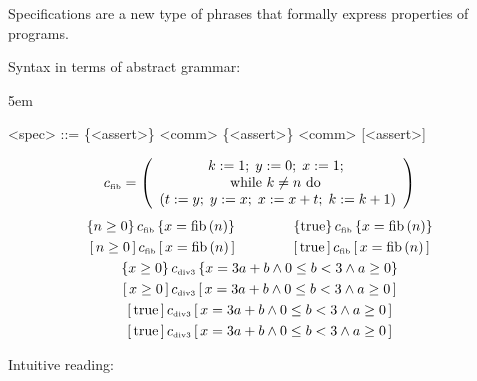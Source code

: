 \begin{enumcirc}
	\item
	Specifications are a new type of phrases that formally express properties of
	programs.
	\item
	Syntax in terms of abstract grammar:
	\begin{center}
		\begin{minipage}{0.5\textwidth}
			\grammarindent5em
			\begin{grammar}
				<spec> ::= \{<assert>\} <comm> \{<assert>\}
				\alt [<assert>] <comm> [<assert>]
			\end{grammar}
		\end{minipage}
	\end{center}
	\begin{exampletab}
		\[
			c_{\textrm{\tiny fib}} = \left( 
				\begin{array}{c}
					k := 1;\; y := 0;\; x:=1;\; \\
					\textrm{while } k \ne n \textrm{ do }            \\ \left( t := y;\; y := x;\; x := x + t;\; k := k + 1 \right)
				\end{array}
			 \right)
		\]
		\[
			\begin{array}{c}
				\left\{ n \ge 0 \right\}
				c_{\textrm{\tiny fib}}
				\left\{ x = \textrm{fib}\left( n \right) \right\}
				\qquad \qquad
				\left\{ \textrm{true} \right\}
				c_{\textrm{\tiny fib}}
				\left\{ x = \textrm{fib}\left( n \right) \right\}
				\\[0.3em]
				\left[ \, n \ge 0 \, \right]
				c_{\textrm{\tiny fib}}
				\left[ \, x = \textrm{fib}\left( n \right) \, \right]
				\qquad \qquad
				\left[ \, \textrm{true} \, \right]
				c_{\textrm{\tiny fib}}
				\left[ \, x = \textrm{fib}\left( n \right) \, \right]
				\\[0.3em]
				\left\{ x \ge 0 \right\}
				c_{\textrm{\tiny div3}}
				\left\{ x = 3a + b \wedge 0 \le b < 3 \wedge a \ge 0 \right\}
				\\[0.3em]
				\left[ \, x \ge 0 \, \right]
				c_{\textrm{\tiny div3}}
				\left[ \, x = 3a + b \wedge 0 \le b < 3 \wedge a \ge 0 \, \right]
				\\[0.3em]
				\left[ \, \textrm{true} \, \right]
				c_{\textrm{\tiny div3}}
				\left[ \, x = 3a + b \wedge 0 \le b < 3 \wedge a \ge 0 \, \right]
				\\[0.3em]
				\left[ \, \textrm{true} \, \right]
				c_{\textrm{\tiny div3}}
				\left[ \, x = 3a + b \wedge 0 \le b < 3 \wedge a \ge 0 \, \right]
			\end{array}
		\]
	\end{exampletab}
	\item
	Intuitive reading:
	\begin{enumrm}
		\item

\end{enumrm}
\end{enumcirc}
